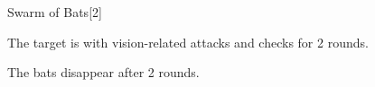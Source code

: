 \begin{spellsection}{Swarm of Bats}[2]
    \begin{spellheader}
    \end{spellheader}
    \begin{spellcontent}
        \begin{spelltargetinginfo}
        \end{spelltargetinginfo}
        \begin{spelleffects}
            \spelleffect The target is \impaired with vision-related attacks and checks for 2 rounds.
        \end{spelleffects}
    \end{spellcontent}
    \begin{spellfooter}
        \spellnotes The bats disappear after 2 rounds.
        \miscastyou
    \end{spellfooter}
    \begin{spellaugments}
    \end{spellaugments}
\end{spellsection}


